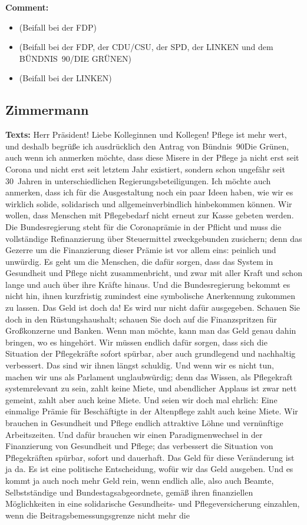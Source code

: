 \documentclass{article}
\begin{document}
\noindent\textbf{Comment:}
\begin{itemize}
    \setlength\itemsep{-3pt}
    \item (Beifall bei der FDP)
    \setlength\itemsep{-3pt}
    \item (Beifall bei der FDP, der CDU/CSU, der SPD, der LINKEN und dem BÜNDNIS 90/DIE GRÜNEN)
    \setlength\itemsep{-3pt}
    \item (Beifall bei der LINKEN)
\end{itemize}
\subsection{Zimmermann}
\noindent\textbf{Texts:} Herr Präsident! Liebe Kolleginnen und Kollegen! Pflege ist mehr wert, und deshalb begrüße ich ausdrücklich den Antrag von Bündnis 90\/Die Grünen,  auch wenn ich anmerken möchte, dass diese Misere in der Pflege ja nicht erst seit Corona und nicht erst seit letztem Jahr existiert, sondern schon ungefähr seit 30 Jahren in unterschiedlichen Regierungsbeteiligungen. Ich möchte auch anmerken, dass ich für die Ausgestaltung noch ein paar Ideen haben, wie wir es wirklich solide, solidarisch und allgemeinverbindlich hinbekommen können. Wir wollen, dass Menschen mit Pflegebedarf nicht erneut zur Kasse gebeten werden. Die Bundesregierung steht für die Coronaprämie in der Pflicht und muss die vollständige Refinanzierung über Steuermittel zweckgebunden zusichern; denn das Gezerre um die Finanzierung dieser Prämie ist vor allem eins: peinlich und unwürdig.  Es geht um die Menschen, die dafür sorgen, dass das System in Gesundheit und Pflege nicht zusammenbricht, und zwar mit aller Kraft und schon lange und auch über ihre Kräfte hinaus. Und die Bundesregierung bekommt es nicht hin, ihnen kurzfristig zumindest eine symbolische Anerkennung zukommen zu lassen. Das Geld ist doch da! Es wird nur nicht dafür ausgegeben. Schauen Sie doch in den Rüstungshaushalt; schauen Sie doch auf die Finanzspritzen für Großkonzerne und Banken. Wenn man möchte, kann man das Geld genau dahin bringen, wo es hingehört.  Wir müssen endlich dafür sorgen, dass sich die Situation der Pflegekräfte sofort spürbar, aber auch grundlegend und nachhaltig verbessert. Das sind wir ihnen längst schuldig. Und wenn wir es nicht tun, machen wir uns als Parlament unglaubwürdig;  denn das Wissen, als Pflegekraft systemrelevant zu sein, zahlt keine Miete, und abendlicher Applaus ist zwar nett gemeint, zahlt aber auch keine Miete. Und seien wir doch mal ehrlich: Eine einmalige Prämie für Beschäftigte in der Altenpflege zahlt auch keine Miete.  Wir brauchen in Gesundheit und Pflege endlich attraktive Löhne und vernünftige Arbeitszeiten. Und dafür brauchen wir einen Paradigmenwechsel in der Finanzierung von Gesundheit und Pflege; das verbessert die Situation von Pflegekräften spürbar, sofort und dauerhaft.  Das Geld für diese Veränderung ist ja da. Es ist eine politische Entscheidung, wofür wir das Geld ausgeben. Und es kommt ja auch noch mehr Geld rein, wenn endlich alle, also auch Beamte, Selbstständige und Bundestagsabgeordnete, gemäß ihren finanziellen Möglichkeiten in eine solidarische Gesundheits- und Pflegeversicherung einzahlen,  wenn die Beitragsbemessungsgrenze nicht mehr die 
\end{document}
